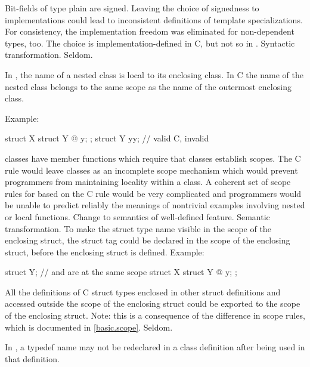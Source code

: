 \change
{}%
Bit-fields of type plain  are signed.
\rationale
Leaving the choice of signedness to implementations could lead to
inconsistent definitions of template specializations. For consistency,
the implementation freedom was eliminated for non-dependent types,
too.
\effect
The choice is implementation-defined in C, but not so in \Cpp{}.
\difficulty
Syntactic transformation.
\howwide
Seldom.

\change In \Cpp{}, the name of a nested class is local to its enclosing class. In C
the name of the nested class belongs to the same scope as the name of the outermost enclosing class.

Example:

\begin{codeblock}
struct X {
  struct Y { @\commentellip@ } y;
};
struct Y yy;                    // valid C, invalid \Cpp{}
\end{codeblock}
\rationale
\Cpp{} classes have member functions which require that classes
establish scopes.
The C rule would leave classes as an incomplete scope mechanism
which would prevent \Cpp{} programmers from maintaining locality
within a class.
A coherent set of scope rules for \Cpp{} based on the C rule would
be very complicated and \Cpp{} programmers would be unable to predict
reliably the meanings of nontrivial examples involving nested or
local functions.
\effect
Change to semantics of well-defined feature.
\difficulty
Semantic transformation.
To make the struct type name visible in the scope of the enclosing
struct, the struct tag could be declared in the scope of the
enclosing struct, before the enclosing struct is defined.
Example:

\begin{codeblock}
struct Y;                       //  and  are at the same scope
struct X {
  struct Y { @\commentellip@ } y;
};
\end{codeblock}

All the definitions of C struct types enclosed in other struct
definitions and accessed outside the scope of the enclosing
struct could be exported to the scope of the enclosing struct.
Note: this is a consequence of the difference in scope rules,
which is documented in \ref{basic.scope}.
\howwide
Seldom.

\change In \Cpp{}, a typedef name may not be redeclared in a class definition after being used in that definition.

